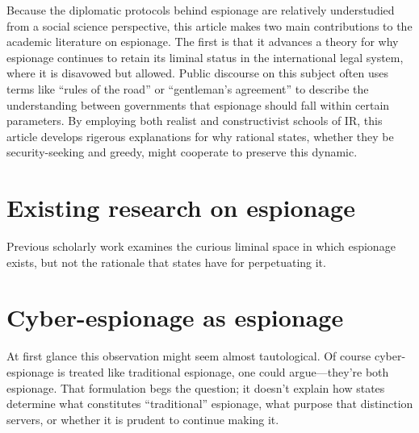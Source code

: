 \documentclass[14pt]{extarticle}
\begin{document}
Because the diplomatic protocols behind espionage are relatively understudied from a social science perspective, this article makes two main contributions to the academic literature on espionage. The first is that it advances a theory for why espionage continues to retain its liminal status in the international legal system, where it is disavowed but allowed. Public discourse on this subject often uses terms like \enquote{rules of the road} or \enquote{gentleman's agreement} to describe the understanding between governments that espionage should fall within certain parameters. By employing both realist and constructivist schools of IR, this article develops rigerous explanations for why rational states, whether they be security-seeking and greedy, might cooperate to preserve this dynamic.

\section{Existing research on espionage}
Previous scholarly work examines the curious liminal space in which espionage exists, but not the rationale that states have for perpetuating it.


\section{Cyber-espionage as espionage}
At first glance this observation might seem almost tautological. Of course cyber-espionage is treated like traditional espionage, one could argue---they're both espionage. That formulation begs the question; it doesn't explain how states determine what constitutes \enquote{traditional} espionage, what purpose that distinction servers, or whether it is prudent to continue making it.








\end{document}
